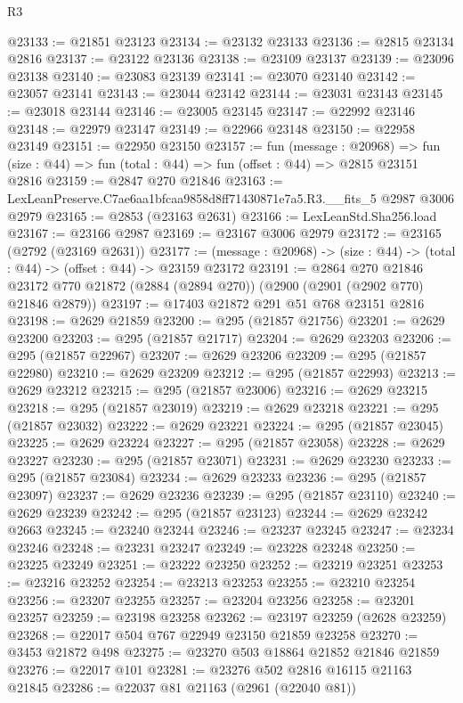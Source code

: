 \begin{lexlean}{R3}
\begin{coremodule}
@23133 := @21851 @23123
@23134 := @23132 @23133
@23136 := @2815 @23134 @2816
@23137 := @23122 @23136
@23138 := @23109 @23137
@23139 := @23096 @23138
@23140 := @23083 @23139
@23141 := @23070 @23140
@23142 := @23057 @23141
@23143 := @23044 @23142
@23144 := @23031 @23143
@23145 := @23018 @23144
@23146 := @23005 @23145
@23147 := @22992 @23146
@23148 := @22979 @23147
@23149 := @22966 @23148
@23150 := @22958 @23149
@23151 := @22950 @23150
@23157 := fun (message : @20968) =>
  fun (size : @44) => fun (total : @44) => fun (offset : @44) => @2815 @23151 @2816
@23159 := @2847 @270 @21846
@23163 := LexLeanPreserve.C7ae6aa1bfcaa9858d8ff71430871e7a5.R3.__fits_5 @2987 @3006 @2979
@23165 := @2853 (@23163 @2631)
@23166 := LexLeanStd.Sha256.load
@23167 := @23166 @2987
@23169 := @23167 @3006 @2979
@23172 := @23165 (@2792 (@23169 @2631))
@23177 := (message : @20968) -> (size : @44) -> (total : @44) -> (offset : @44) -> @23159 @23172
@23191 := @2864
    @270
    @21846
    @23172
    @770
    @21872
    (@2884 (@2894 @270))
    (@2900 (@2901 (@2902 @770) @21846 @2879))
@23197 := @17403 @21872 @291 @51 @768 @23151 @2816
@23198 := @2629 @21859
@23200 := @295 (@21857 @21756)
@23201 := @2629 @23200
@23203 := @295 (@21857 @21717)
@23204 := @2629 @23203
@23206 := @295 (@21857 @22967)
@23207 := @2629 @23206
@23209 := @295 (@21857 @22980)
@23210 := @2629 @23209
@23212 := @295 (@21857 @22993)
@23213 := @2629 @23212
@23215 := @295 (@21857 @23006)
@23216 := @2629 @23215
@23218 := @295 (@21857 @23019)
@23219 := @2629 @23218
@23221 := @295 (@21857 @23032)
@23222 := @2629 @23221
@23224 := @295 (@21857 @23045)
@23225 := @2629 @23224
@23227 := @295 (@21857 @23058)
@23228 := @2629 @23227
@23230 := @295 (@21857 @23071)
@23231 := @2629 @23230
@23233 := @295 (@21857 @23084)
@23234 := @2629 @23233
@23236 := @295 (@21857 @23097)
@23237 := @2629 @23236
@23239 := @295 (@21857 @23110)
@23240 := @2629 @23239
@23242 := @295 (@21857 @23123)
@23244 := @2629 @23242 @2663
@23245 := @23240 @23244
@23246 := @23237 @23245
@23247 := @23234 @23246
@23248 := @23231 @23247
@23249 := @23228 @23248
@23250 := @23225 @23249
@23251 := @23222 @23250
@23252 := @23219 @23251
@23253 := @23216 @23252
@23254 := @23213 @23253
@23255 := @23210 @23254
@23256 := @23207 @23255
@23257 := @23204 @23256
@23258 := @23201 @23257
@23259 := @23198 @23258
@23262 := @23197 @23259 (@2628 @23259)
@23268 := @22017 @504 @767 @22949 @23150 @21859 @23258
@23270 := @3453 @21872 @498
@23275 := @23270 @503 @18864 @21852 @21846 @21859
@23276 := @22017 @101
@23281 := @23276 @502 @2816 @16115 @21163 @21845
@23286 := @22037 @81 @21163 (@2961 (@22040 @81))

\end{coremodule}
\end{lexlean}
